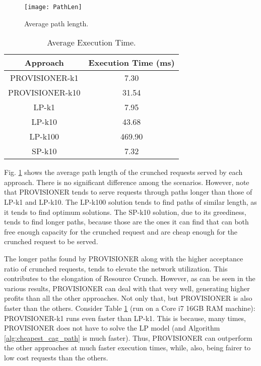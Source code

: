 \documentclass[journal]{IEEEtran}
\begin{document}

\begin{figure}[!t] 
 \centering
 \texttt{[image: PathLen]} 
 \caption{Average path length.}
 \label{res:path} 
\end{figure}

\begin{table}[!t]%
\caption{Average Execution Time.}\label{tab:exec_time}
\centering
\tabcolsep=0.11cm
 \begin{tabular}{|c|c|}%
  \hline
	Approach		& Execution Time (ms) \\ \hline
	PROVISIONER-k1	&7.30	\\ \hline
	PROVISIONER-k10	&31.54	\\ \hline
 LP-k1			&7.95	\\ \hline
 LP-k10			&43.68	\\ \hline
 LP-k100			&469.90	\\ \hline
 SP-k10			&7.32	\\ \hline
  \hline
 \end{tabular}
 
\end{table}

Fig. \ref{res:path} shows the average path length of the crunched requests served by each approach. There is no significant difference among the scenarios. However, note that PROVISIONER tends to serve requests through paths longer than those of LP-k1 and LP-k10. The LP-k100 solution tends to find paths of similar length, as it tends to find optimum solutions. The SP-k10 solution, due to its greediness, tends to find longer paths, because those are the ones it can find that can both free enough capacity for the crunched request and are cheap enough for the crunched request to be served. 

The longer paths found by PROVISIONER along with the higher acceptance ratio of crunched requests, tends to elevate the network utilization. This contributes to the elongation of Resource Crunch. However, as can be seen in the various results, PROVISIONER can deal with that very well, generating higher profits than all the other approaches. Not only that, but PROVISIONER is also faster than the others. Consider Table \ref{tab:exec_time} (run on a Core i7 16GB RAM machine): PROVISIONER-k1 runs even faster than LP-k1. This is because, many times, PROVISIONER does not have to solve the LP model (and Algorithm \ref{alg:cheapest_cag_path} is much faster). Thus, PROVISIONER can outperform the other approaches at much faster execution times, while, also, being fairer to low cost requests than the others.
\end{document}
